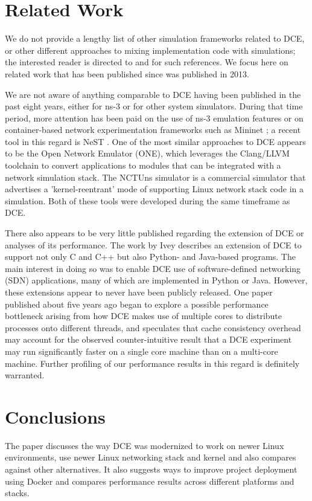 \documentclass{sig-alternate}
\begin{document}
\section{Related Work}
We do not provide a lengthy list of other simulation frameworks related
to DCE, or other different approaches to mixing implementation code with
simulations; the interested reader is directed to \cite{Tazaki13} and
\cite{Lacage10} for such references.  We focus here on related work that has
been published since \cite{Tazaki13} was published in 2013.

We are not aware of anything comparable to DCE having been published in
the past eight years, either for ns-3 or for other system simulators.  
During that time period, more attention has been paid on the use of
ns-3 emulation features or on container-based network experimentation
frameworks such as Mininet \cite{Handigol12}; a recent tool in this regard is
NeST \cite{Rai20}.  One of the most similar approaches to DCE appears to
be the Open Network Emulator (ONE)\cite{Duggirala12}, which leverages the
Clang/LLVM
toolchain to convert applications to modules that can be integrated
with a network simulation stack.  The NCTUns simulator \cite{Wang03}
is a commercial simulator that advertises a 'kernel-reentrant' mode
of supporting Linux network stack code in a simulation.  Both of these
tools were developed during the same timeframe as DCE.

There also appears to be very little published regarding the extension
of DCE or analyses of its performance.  The work by Ivey \cite{Ivey16}
describes an extension of DCE to support not only C and C++ but also
Python- and Java-based programs.  The main interest in doing so was
to enable DCE use of software-defined networking (SDN) applications,
many of which are implemented in Python or Java.  However, these
extensions appear to never have been publicly released.  
One paper published about five years ago \cite{Wiggins16} began to explore
a possible performance bottleneck arising from how DCE makes use of multiple
cores to distribute processes onto different threads, and speculates that
cache consistency overhead may account for the observed counter-intuitive
result that a DCE experiment may run significantly faster on a single core
machine than on a multi-core machine.   Further profiling of our performance
results in this regard is definitely warranted. 

\section{Conclusions}
The paper discusses the way DCE was modernized to work on newer Linux environments, 
use newer Linux networking stack and kernel and also compares against other alternatives. 
It also suggests ways to improve project deployment using Docker and compares performance results across different platforms and stacks.
\end{document}
